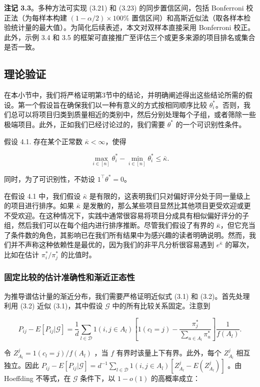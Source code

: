 \textbf{注记 3.3}。多种方法可实现 (3.21) 和 (3.23) 的同步置信区间，包括 Bonferroni 校正法（为每样本构建 $(1 - \alpha /2)\times 100\%$ 置信区间）和高斯近似法（取各样本检验统计量的最大值）。为简化后续表述，本文对双样本直接采用 Bonferroni 校正。此外，示例 3.4 和 3.5 的框架可直接推广至评估三个或更多来源的项目排名或集合是否一致。

\subsection{理论验证}

在本小节中，我们将严格证明第3节中的结论，并明确阐述得出这些结论所需的假设。第一个假设旨在确保我们以一种有意义的方式按相同顺序比较 $\theta_{i}^{*}$。否则，我们总可以将项目归类到质量相近的类别中，然后分别处理每个子组，或者筛除一些极端项目。此外，正如我们已经讨论过的，我们需要 $\theta^{*}$ 的一个可识别性条件。

假设 4.1. 存在某个正常数 $\bar{\kappa} < \infty$，使得

$$
\max_{i\in [n]}\theta_{i}^{*} - \min_{i\in [n]}\theta_{i}^{*}\leq \bar{\kappa}.
$$

同时，为了可识别性，不妨设 $1^{\top}\theta^{*} = 0$。

在假设 4.1 中，我们假设 $\bar{\kappa}$ 是有限的，这表明我们只对偏好评分处于同一量级上的项目进行排序。如果 $\bar{\kappa}$ 是发散的，那么某些项目显然比其他项目更受欢迎或更不受欢迎。在这种情况下，实践中通常很容易将项目分成具有相似偏好评分的子组，然后我们可以在每个组内进行排序推断。尽管我们假设了有界的 $\bar{\kappa}$，但它充当了条件数的角色，其影响已在我们所有结果中为感兴趣的读者明确说明。然而，我们并不声称这种依赖性是最优的，因为我们的非平凡分析很容易遇到 $e^{\bar{\kappa}}$ 的幂次，比如在估计 $\pi_{i}^{*} / \pi_{j}^{*}$ 的比值时。


\subsubsection{固定比较的估计准确性和渐近正态性}

为推导谱估计量的渐近分布，我们需要严格证明近似式 (3.1) 和 (3.2)。首先处理利用 (3.2) 近似 (3.1)，其中假设 $\mathcal{G}$ 中的所有比较关系固定。注意到

$$
P_{ij} - E[P_{ij}|\mathcal{G}] = \frac{1}{d}\sum_{l\in \mathcal{D}}1(i,j\in A_l)\left[1(c_l = j) - \frac{\pi_j^*}{\sum_{u\in A_l}\pi_u^*}\right]\frac{1}{f(A_l)}.
$$

令 $Z_{A_l}^j = 1(c_l = j) / f(A_l)$ ，当 $f$ 有界时该量上下有界。此外，每个 $Z_{A_l}^j$ 相互独立。因此 $P_{ij} - E[P_{ij}|\mathcal{G}] = d^{-1}\sum_{l\in \mathcal{D}}1(i,j\in A_l)[Z_{A_l}^j - E(Z_{A_l}^j)]$ 。由 Hoeffding 不等式，在 $\mathcal{G}$ 条件下，以 $1 - o(1)$ 的高概率成立：

